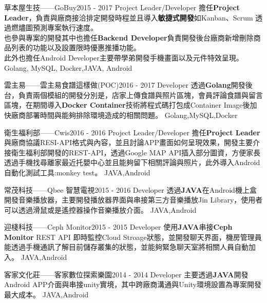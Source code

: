 %
%
%


\begin{projects}
	\project
	{草本屋生技——GoBuy}{2015 - 2017}
	{Project Leader/Developer}
	{擔任\textbf{Project  Leader}，負責與廠商接洽排定開發時程並且導入\textbf{敏捷式開發}如Kanban、Scrum 透過燃燼圖預測專案執行速度。
	\\
	也參與專案的開發其中也擔任\textbf{Backend Developer}負責開發後台廠商新增刪除商品列表的功能以及設置限時優惠推播功能。
	\\
	此外也擔任Android Developer主要帶學弟開發手機畫面以及元件特效呈現。
	}
	{Golang, MySQL, Docker,JAVA, Android}
    
	\project
	{雲主易——雲主易食譜這樣做(POC)}{2016 - 2017}
	{Developer}
	{透過\textbf{Golang}開發後台，負責兩個模組的開發分別是，店家上傳食譜與照片區塊，會員評論食譜與留言區塊，在期間導入\textbf{Docker  Container}技術將程式碼打包成Container Image後加快廠商部署時間與能夠排除環境造成的相關問題。
	}
	{Golang,MySQL,Docker}

				
	\project
	{衛生福利部——Cwis}{2016 - 2016}
	{Project Leader/Developer}
	{擔任\textbf{Project Leader}與廠商協議RESI-API格式與內容，並且討論APP畫面如何呈現效果，開發主要介接衛生福利部開發的REST-API，透過Google MAP API插入部分圖資，方便家長透過手機找尋離家最近托嬰中心並且能夠留下相關評論與照片，此外導入Android自動化測試工具:monkey test。
	}
	{JAVA,Android}
	
	\project
	{常茂科技——Qbee 智慧電視}{2015 - 2016}
	{Developer}
	{透過\textbf{JAVA}在Android機上盒開發音樂播放器，主要開發播放器界面與串接第三方音樂播放Jin Library，使用者可以透過滑鼠或是遙控器操作音樂播放介面。}
	{JAVA,Android}
	
	\project
	{迎棧科技——Ceph Monitor}{2015 - 2015}
	{Developer}
	{使用\textbf{JAVA}串接\textbf{Ceph Monitor}  REST API 即時監控Cloud Stroage狀態，並開發聊天界面，機房管理員能透過手機通訊了解目前儲存叢集的狀態，並能夠緊急聊天室將相關人員自動加入。}
	{JAVA,Android}
	
	\project
	{客家文化莊——客家數位探索樂園}{2014 - 2014}
	{Developer}
	{主要透過\textbf{JAVA}開發Android APP介面與串接unity實境，其中跨廠商溝通與Unity環境設置為專案開發最大成本。}
	{JAVA,Android}

\end{projects}